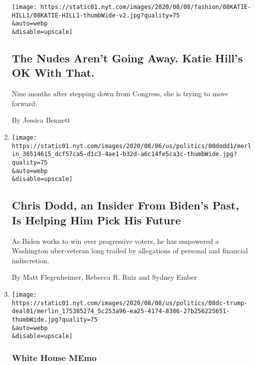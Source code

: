 \begin{enumerate}
  \texttt{[image: https://static01.nyt.com/images/2020/08/08/fashion/08KATIE-HILL1/08KATIE-HILL1-thumbWide-v2.jpg?quality=75\\\&auto=webp\\\&disable=upscale]}

  \hypertarget{the-nudes-arent-going-away-katie-hills-ok-with-that}{%
  \subsection{The Nudes Aren't Going Away. Katie Hill's OK With
  That.}\label{the-nudes-arent-going-away-katie-hills-ok-with-that}}

  Nine months after stepping down from Congress, she is trying to move
  forward.

  By Jessica Bennett
\item
  \href{/2020/08/08/us/politics/biden-vp-chris-dodd.html}{}

  \texttt{[image: https://static01.nyt.com/images/2020/08/06/us/politics/00dodd1/merlin\_36514615\_dcf57ca5-d1c3-4ae1-b32d-a6c14fe5ca3c-thumbWide.jpg?quality=75\\\&auto=webp\\\&disable=upscale]}

  \hypertarget{chris-dodd-an-insider-from-bidens-past-is-helping-him-pick-his-future}{%
  \subsection{Chris Dodd, an Insider From Biden's Past, Is Helping Him
  Pick His
  Future}\label{chris-dodd-an-insider-from-bidens-past-is-helping-him-pick-his-future}}

  As Biden works to win over progressive voters, he has empowered a
  Washington uber-veteran long trailed by allegations of personal and
  financial indiscretion.

  By Matt Flegenheimer, Rebecca R. Ruiz and Sydney Ember
\item
  \href{/2020/08/08/us/politics/trump-tiktok-deal-treasury.html}{}

  \texttt{[image: https://static01.nyt.com/images/2020/08/08/us/politics/08dc-trump-deal01/merlin\_175385274\_5c253a96-ea25-4174-8386-27b256225651-thumbWide.jpg?quality=75\\\&auto=webp\\\&disable=upscale]}

  \hypertarget{white-house-memo}{%
  \subsubsection{White House MEmo}\label{white-house-memo}}

  \hypertarget{trump-wants-us-to-get-cut-of-any-tiktok-deal-no-one-knows-how-thatd-work}{%
}
\end{enumerate}
